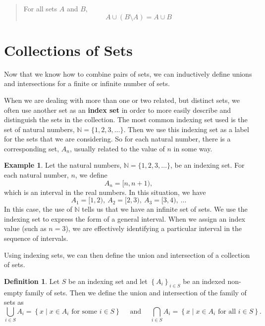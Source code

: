 \documentclass[
]{book}
\let\stdsection\section
\renewcommand\section{\newpage\stdsection}
\theoremstyle{definition}
\newtheorem{definition}{Definition}[chapter]
\theoremstyle{definition}
\newtheorem{example}{Example}[chapter]
\theoremstyle{definition}
\theoremstyle{definition}
\theoremstyle{remark}
\begin{document}
\begin{quote}
For all sets \(A\) and \(B\), \[A \cup (B\setminus A)= A \cup B\]
\end{quote}

\hypertarget{collections-of-sets}{%
\section{Collections of Sets}\label{collections-of-sets}}

Now that we know how to combine pairs of sets, we can inductively define unions and intersections for a finite or infinite number of sets.

When we are dealing with more than one or two related, but distinct sets, we often use another set as an \textbf{index set} in order to more easily describe and distinguish the sets in the collection. The most common indexing set used is the set of natural numbers, \(\mathbb{N}=\{1, 2, 3, \ldots \}\). Then we use this indexing set as a label for the sets that we are considering. So for each natural number, there is a corresponding set, \(A_n\), usually related to the value of \(n\) in some way.

\begin{example}
Let the natural numbers, \(\mathbb{N}=\{1, 2, 3, \ldots \}\), be an indexing set. For each natural number, \(n\), we define \[A_n = [n,n+1),\] which is an interval in the real numbers. In this situation, we have
\[A_1 = [1,2), \:  A_2 = [2,3), \: A_3 = [3,4),\:  \ldots \]
In this case, the use of \(\mathbb{N}\) tells us that we have an infinite set of sets. We use the indexing set to express the form of a general interval. When we assign an index value (such as \(n=3\)), we are effectively identifying a particular interval in the sequence of intervals.
\end{example}

Using indexing sets, we can then define the union and intersection of a collection of sets.

\begin{definition}
\protect\hypertarget{def:set-indexing}{}\label{def:set-indexing}Let \(S\) be an indexing set and let \(\left\{ A_i\right\}_{i\in S}\) be an indexed non-empty family of sets. Then we define the union and intersection of the family of sets as
\[\bigcup_{i\in S} A_i = \left\{ x \middle \vert x\in A_i \mbox{ for some } i\in S\right\} \quad \mbox{ and } \quad \bigcap_{i\in S} A_i = \left\{ x\middle \vert x\in A_i \mbox{ for all } i \in S\right\}.\]
\end{definition}
\end{document}
